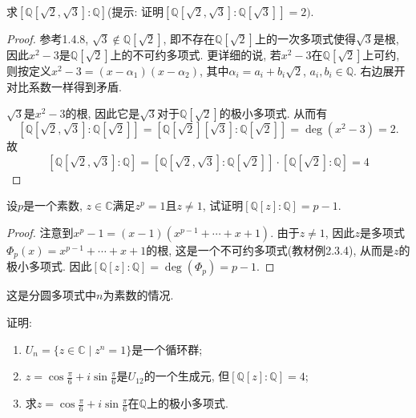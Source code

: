 \documentclass{../solutions-cn}
\begin{document}
\begin{exercise}[习题3.1.4]
    求$\left[\mathbb{Q}[\sqrt2, \sqrt3]:\mathbb{Q}\right]$(提示: 证明$\left[\mathbb{Q}[\sqrt2, \sqrt3]:\mathbb{Q}[\sqrt3]\right] = 2)$.
\end{exercise}

\begin{proof}
    参考1.4.8, $\sqrt{3} \notin \mathbb{Q}[\sqrt{2}]$, 即不存在$\mathbb{Q}[\sqrt{2}]$上的一次多项式使得$\sqrt{3}$是根, 因此$x^2 - 3$是$\mathbb{Q}[\sqrt{2}]$上的不可约多项式. 更详细的说, 若$x^2 - 3$在$\mathbb{Q}[\sqrt{2}]$上可约, 则按定义$x^2 - 3 = (x - \alpha_1)(x - \alpha_2)$, 其中$\alpha_i = a_i + b_i\sqrt{2}$, $a_i, b_i \in \mathbb{Q}$. 右边展开对比系数一样得到矛盾.

    $\sqrt{3}$是$x^2 - 3$的根, 因此它是$\sqrt{3}$对于$\mathbb{Q}[\sqrt{2}]$的极小多项式. 从而有
    \[
        \left[\mathbb{Q}[\sqrt{2}, \sqrt{3}]:\mathbb{Q}[\sqrt{2}]\right] = \left[\mathbb{Q}[\sqrt{2}][\sqrt{3}]:\mathbb{Q}[\sqrt{2}]\right] = \deg(x^2 - 3) = 2.
    \]
    故
    \[
        \left[\mathbb{Q}[\sqrt{2}, \sqrt{3}]:\mathbb{Q}\right] = \left[\mathbb{Q}[\sqrt{2}, \sqrt{3}]:\mathbb{Q}[\sqrt{2}]\right] \cdot \left[\mathbb{Q}[\sqrt{2}]:\mathbb{Q}\right] = 4
    \]
\end{proof}

\begin{exercise}[习题3.1.5]
    设$p$是一个素数, $z \in \mathbb{C}$满足$z^p = 1$且$z \neq 1$, 试证明$[\mathbb{Q}[z]:\mathbb{Q}] = p - 1$.
\end{exercise}

\begin{proof}
    注意到$x^p - 1 = (x - 1)(x^{p - 1} + \cdots + x + 1)$. 由于$z \neq 1$, 因此$z$是多项式$\Phi_p(x) = x^{p - 1} + \cdots + x + 1$的根, 这是一个不可约多项式(教材例2.3.4), 从而是$z$的极小多项式. 因此$[\mathbb{Q}[z]:\mathbb{Q}] = \deg(\Phi_p) = p - 1$.
\end{proof}

\begin{remark}
    这是分圆多项式中$n$为素数的情况.
\end{remark}

\begin{exercise}[习题3.1.6]
    证明:
    \begin{enumerate}[(1)]
        \item $U_n = \{z \in \mathbb{C} \mid z^n = 1\}$是一个循环群;
        \item $z = \cos \frac\pi6 + i\sin \frac\pi6$是$U_{12}$的一个生成元, 但$[\mathbb{Q}[z]:\mathbb{Q}] = 4$;
        \item 求$z = \cos \frac\pi6 + i\sin \frac\pi6$在$\mathbb{Q}$上的极小多项式.
    \end{enumerate}
\end{exercise}
\end{document}
